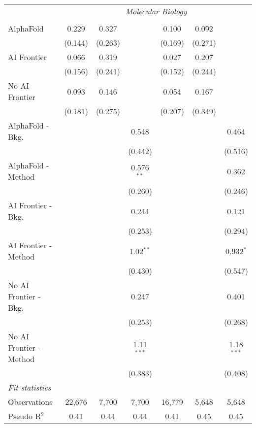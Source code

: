 \begin{tabular}{lcccccc}
 & \multicolumn{6}{c}{\textit{Molecular Biology}} \\ \\
   AlphaFold               & 0.229   & 0.327   &              & 0.100   & 0.092   &   \\   
                           & (0.144) & (0.263) &              & (0.169) & (0.271) &   \\   
   AI Frontier             & 0.066   & 0.319   &              & 0.027   & 0.207   &   \\   
                           & (0.156) & (0.241) &              & (0.152) & (0.244) &   \\   
   No AI Frontier          & 0.093   & 0.146   &              & 0.054   & 0.167   &   \\   
                           & (0.181) & (0.275) &              & (0.207) & (0.349) &   \\   
   AlphaFold - Bkg.        &         &         & 0.548        &         &         & 0.464\\   
                           &         &         & (0.442)      &         &         & (0.516)\\   
   AlphaFold - Method      &         &         & 0.576$^{**}$ &         &         & 0.362\\   
                           &         &         & (0.260)      &         &         & (0.246)\\   
   AI Frontier - Bkg.      &         &         & 0.244        &         &         & 0.121\\   
                           &         &         & (0.253)      &         &         & (0.294)\\   
   AI Frontier - Method    &         &         & 1.02$^{**}$  &         &         & 0.932$^{*}$\\   
                           &         &         & (0.430)      &         &         & (0.547)\\   
   No AI Frontier - Bkg.   &         &         & 0.247        &         &         & 0.401\\   
                           &         &         & (0.253)      &         &         & (0.268)\\   
   No AI Frontier - Method &         &         & 1.11$^{***}$ &         &         & 1.18$^{***}$\\   
                           &         &         & (0.383)      &         &         & (0.408)\\   
   \midrule
   \emph{Fit statistics}\\
   Observations            & 22,676  & 7,700   & 7,700        & 16,779  & 5,648   & 5,648\\  
   Pseudo R$^2$            & 0.41    & 0.44    & 0.44         & 0.41    & 0.45    & 0.45\\  
   

\end{tabular}

